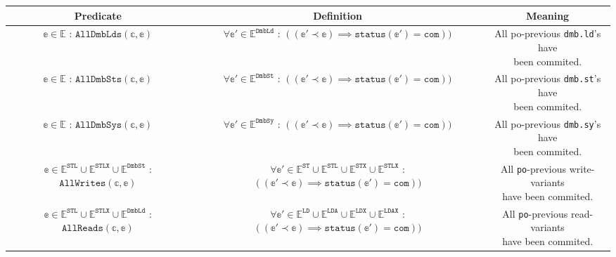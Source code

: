 \documentclass{article}
\newcommand{\var}{\texttt}
\begin{document}
\begin{center}
 \begin{longtable}{||c | c | c||} 
 \hline
 \textbf{Predicate} & \textbf{Definition} & \textbf{Meaning} \\ [0.5ex] 
 \hline\hline
 \makecell{$\mathbb{e} \in \mathbb{E}$ :\\$\texttt{AllDmbLds}(\mathbb{c},\mathbb{e})$} & \makecell{$\forall \mathbb{e}' \in \mathbb{E}^\texttt{DmbLd}$ :\\$((\mathbb{e'} \prec \mathbb{e}) \implies \texttt{status}(\mathbb{e}') = \texttt{com}))$} & \makecell{All po-previous \var{dmb.ld}'s have\\ been commited.} \\
 \hline
 \makecell{$\mathbb{e} \in \mathbb{E}$ :\\$\texttt{AllDmbSts}(\mathbb{c},\mathbb{e})$} & \makecell{$\forall \mathbb{e}' \in \mathbb{E}^\texttt{DmbSt}$ :\\$((\mathbb{e'} \prec \mathbb{e}) \implies \texttt{status}(\mathbb{e}') = \texttt{com}))$} & \makecell{All po-previous \var{dmb.st}'s have\\ been commited.}  \\
 \hline
 \makecell{$\mathbb{e} \in \mathbb{E}$ :\\$\texttt{AllDmbSys}(\mathbb{c},\mathbb{e})$} & \makecell{$\forall \mathbb{e}' \in \mathbb{E}^\texttt{DmbSy}$ :\\$((\mathbb{e'} \prec \mathbb{e}) \implies \texttt{status}(\mathbb{e}') = \texttt{com}))$} & \makecell{All po-previous \var{dmb.sy}'s have\\ been commited.} \\
 \hline
 \makecell{$\mathbb{e} \in \mathbb{E}^\var{STL} \cup \mathbb{E}^\var{STLX} \cup \mathbb{E}^\var{DmbSt}$ :\\$\texttt{AllWrites}(\mathbb{c},\mathbb{e})$} & \makecell{$\forall \mathbb{e}' \in \mathbb{E}^\var{ST} \cup \mathbb{E}^\texttt{STL} \cup \mathbb{E}^\texttt{STX} \cup \mathbb{E}^\texttt{STLX}$ :\\$((\mathbb{e'} \prec \mathbb{e}) \implies \texttt{status}(\mathbb{e}') = \texttt{com}))$} & \makecell{All \var{po}-previous write-variants\\ have been commited.} \\
 \hline
 \makecell{$\mathbb{e} \in \mathbb{E}^\var{STL} \cup \mathbb{E}^\var{STLX} \cup \mathbb{E}^\var{DmbLd}$ :\\$\texttt{AllReads}(\mathbb{c},\mathbb{e})$} & \makecell{$\forall \mathbb{e}' \in \mathbb{E}^\var{LD} \cup \mathbb{E}^\texttt{LDA} \cup \mathbb{E}^\texttt{LDX} \cup \mathbb{E}^\texttt{LDAX}$ :\\$((\mathbb{e'} \prec \mathbb{e}) \implies \texttt{status}(\mathbb{e}') = \texttt{com}))$} & \makecell{All \var{po}-previous read-variants\\ have been commited.} \\

\end{longtable}
\end{center}
\end{document}
